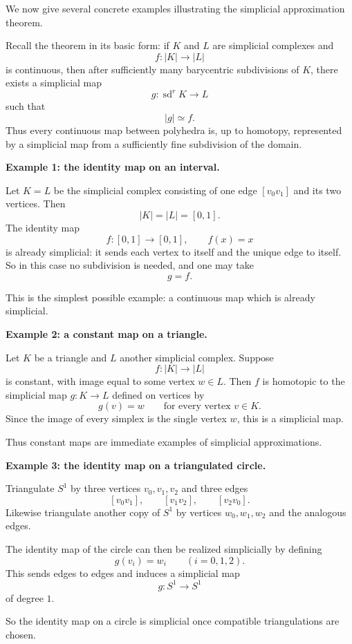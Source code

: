 \documentclass[12pt,a4paper]{article}
\theoremstyle{notespace}
\begin{document}
We now give several concrete examples illustrating the simplicial approximation theorem.

Recall the theorem in its basic form: if \(K\) and \(L\) are simplicial complexes and
\[
f:|K|\to |L|
\]
is continuous, then after sufficiently many barycentric subdivisions of \(K\), there exists a simplicial map
\[
g:\operatorname{sd}^r K \to L
\]
such that
\[
|g| \simeq f.
\]
Thus every continuous map between polyhedra is, up to homotopy, represented by a simplicial map from a sufficiently fine subdivision of the domain.

\medskip

\textbf{Example 1: the identity map on an interval.}

Let \(K=L\) be the simplicial complex consisting of one edge \([v_0v_1]\) and its two vertices. Then
\[
|K|=|L|=[0,1].
\]
The identity map
\[
f:[0,1]\to [0,1],\qquad f(x)=x
\]
is already simplicial: it sends each vertex to itself and the unique edge to itself. So in this case no subdivision is needed, and one may take
\[
g=f.
\]

This is the simplest possible example: a continuous map which is already simplicial.

\medskip

\textbf{Example 2: a constant map on a triangle.}

Let \(K\) be a triangle and \(L\) another simplicial complex. Suppose
\[
f:|K|\to |L|
\]
is constant, with image equal to some vertex \(w\in L\). Then \(f\) is homotopic to the simplicial map \(g:K\to L\) defined on vertices by
\[
g(v)=w
\qquad\text{for every vertex } v\in K.
\]
Since the image of every simplex is the single vertex \(w\), this is a simplicial map.

Thus constant maps are immediate examples of simplicial approximations.

\medskip

\textbf{Example 3: the identity map on a triangulated circle.}

Triangulate \(S^1\) by three vertices \(v_0,v_1,v_2\) and three edges
\[
[v_0v_1],\qquad [v_1v_2],\qquad [v_2v_0].
\]
Likewise triangulate another copy of \(S^1\) by vertices \(w_0,w_1,w_2\) and the analogous edges.

The identity map of the circle can then be realized simplicially by defining
\[
g(v_i)=w_i
\qquad (i=0,1,2).
\]
This sends edges to edges and induces a simplicial map
\[
g:S^1\to S^1
\]
of degree \(1\).

So the identity map on a circle is simplicial once compatible triangulations are chosen.
\end{document}
